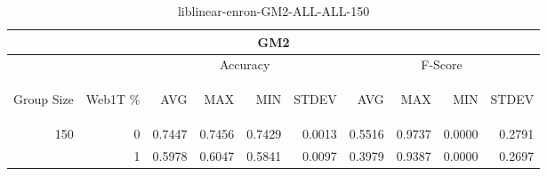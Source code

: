 \begin{center}
\begin{table}[htbp] 
 \begin{center}
\begin{tabular}{ | r | r | r | r | r | r | r | r | r | r |}
\hline
\multicolumn{10}{|c|}{GM2}\\
\hline
 & & \multicolumn{4}{|c|}{Accuracy} & \multicolumn{4}{|c|}{F-Score}\\ \cline{3-10}
\begin{sideways}Group Size\end{sideways} & \begin{sideways}Web1T \%\end{sideways} & \begin{sideways}AVG\end{sideways} & \begin{sideways}MAX\end{sideways} & \begin{sideways}MIN\end{sideways} & \begin{sideways}STDEV\end{sideways} & \begin{sideways}AVG\end{sideways} & \begin{sideways}MAX\end{sideways} & \begin{sideways}MIN\end{sideways} & \begin{sideways}STDEV\end{sideways}\\
\hline
\multirow{1}{*}{150}
 & 0 & 0.7447 & 0.7456 & 0.7429 & 0.0013 & 0.5516 & 0.9737 & 0.0000 & 0.2791\\ \cline{2-10}
 & 1 & 0.5978 & 0.6047 & 0.5841 & 0.0097 & 0.3979 & 0.9387 & 0.0000 & 0.2697\\ \cline{2-10}
\hline
\end{tabular}
\caption{liblinear-enron-GM2-ALL-ALL-150}
\label{table:liblinear-enron-GM2-ALL-ALL-150}
\end{center}
 \end{table}
\end{center}

